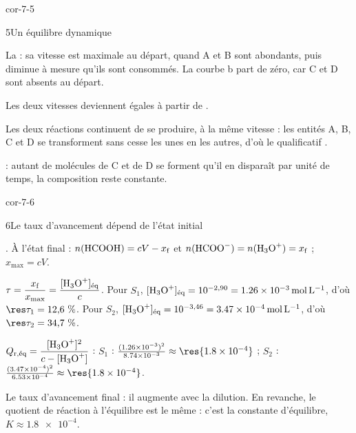 \begin{blocLivre}{cor-7-5}
\begin{corrige}{5}{Un équilibre dynamique}
\begin{questions}
\item La  : sa vitesse est maximale au départ, quand A et B sont abondants, puis diminue à mesure
qu'ils sont consommés. La courbe b part de zéro, car C et D sont absents au départ.
\item Les deux vitesses deviennent égales à partir de .
\item Les deux réactions continuent de se produire, à la même vitesse : les entités A, B, C et D se transforment sans
cesse les unes en les autres, d'où le qualificatif .
\item {} : autant de molécules de C et de D se forment qu'il en disparaît par unité de temps, la
composition reste constante.
\end{questions}
\end{corrige}
\end{blocLivre}
\begin{blocLivre}{cor-7-6}
\begin{corrige}{6}{Le taux d'avancement dépend de l'état initial}
\begin{questions}
\item {}. À l'état final : $n(\ce{HCOOH})=cV-x_\mathrm{f}$ et
$n(\ce{HCOO-})=n(\ce{H3O+})=x_\mathrm{f}$ ; $x_{\max}=cV$.
\item $\tau=\dfrac{x_\mathrm{f}}{x_{\max}}=\dfrac{[\ce{H3O+}]_\text{éq}}{c}$. Pour $S_1$, $[\ce{H3O+}]_\text{éq}=10^{-2{,}90}=\qty{1,26e-3}{mol.L^{-1}}$,
d'où $\res{\tau_1=12{,}6~\%}$. Pour $S_2$, $[\ce{H3O+}]_\text{éq}=10^{-3{,}46}=\qty{3,47e-4}{mol.L^{-1}}$, d'où
$\res{\tau_2=34{,}7~\%}$.
\item $Q_{\mathrm{r},\text{éq}}=\dfrac{[\ce{H3O+}]^2}{c-[\ce{H3O+}]}$ : $S_1$ : $\frac{(\num{1.26e-3})^2}{\num{8.74e-3}}\approx\res{\num{1.8e-4}}$ ;
$S_2$ : $\frac{(\num{3.47e-4})^2}{\num{6.53e-4}}\approx\res{\num{1.8e-4}}$.
\item Le taux d'avancement final  : il augmente avec la dilution. En revanche, le
quotient de réaction à l'équilibre est le même : c'est la constante d'équilibre, $K\approx\num{1.8e-4}$.
\end{questions}
\end{corrige}
\end{blocLivre}
